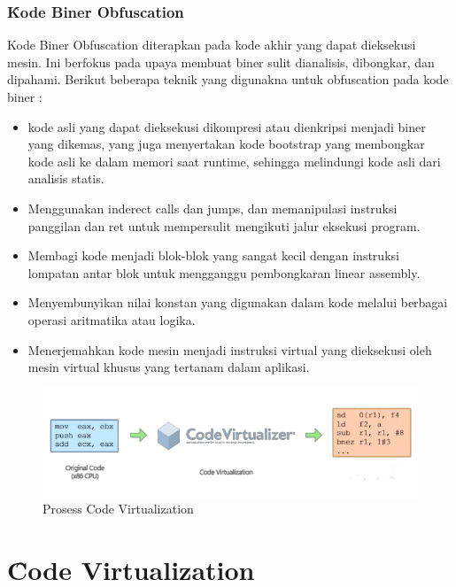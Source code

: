 \subsubsection{\f{Kode Biner Obfuscation}}
Kode Biner Obfuscation diterapkan pada kode akhir yang dapat dieksekusi mesin. Ini berfokus pada upaya membuat biner sulit dianalisis, dibongkar, dan dipahami. Berikut beberapa teknik yang digunakna untuk obfuscation pada kode biner :
\begin{itemize}
	\item {} kode asli yang dapat dieksekusi dikompresi atau dienkripsi menjadi biner yang dikemas, yang juga menyertakan kode bootstrap yang membongkar kode asli ke dalam memori saat runtime, sehingga melindungi kode asli dari analisis statis.
	\item {} Menggunakan inderect calls dan  jumps, dan memanipulasi instruksi panggilan dan ret untuk mempersulit mengikuti jalur eksekusi program.
	\item {} Membagi kode menjadi blok-blok yang sangat kecil dengan instruksi lompatan antar blok untuk mengganggu pembongkaran linear assembly.
	\item {} Menyembunyikan nilai konstan yang digunakan dalam kode melalui berbagai operasi aritmatika atau logika.
	\item {} Menerjemahkan kode mesin menjadi instruksi virtual yang dieksekusi oleh mesin virtual khusus yang tertanam dalam aplikasi.
\end{itemize}

\begin{figure}
	\centering
	\includegraphics[width=.8\textwidth]
	{assets/pics/code_virtualization_process.png}
	\caption{Prosess Code Virtualization \cite{Ore06}}
	\label{F:virtualization_process}
\end{figure}
\section{\f{Code Virtualization}}

